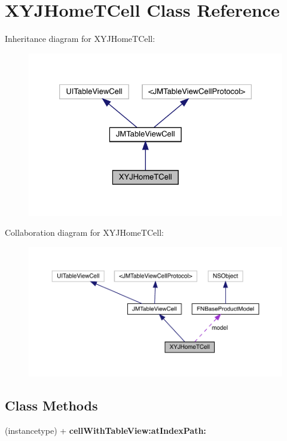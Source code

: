 \hypertarget{interface_x_y_j_home_t_cell}{}\section{X\+Y\+J\+Home\+T\+Cell Class Reference}
\label{interface_x_y_j_home_t_cell}


Inheritance diagram for X\+Y\+J\+Home\+T\+Cell\+:\nopagebreak
\begin{figure}[H]
\begin{center}
\leavevmode
\includegraphics[width=326pt]{interface_x_y_j_home_t_cell__inherit__graph}
\end{center}
\end{figure}


Collaboration diagram for X\+Y\+J\+Home\+T\+Cell\+:\nopagebreak
\begin{figure}[H]
\begin{center}
\leavevmode
\includegraphics[width=350pt]{interface_x_y_j_home_t_cell__coll__graph}
\end{center}
\end{figure}
\subsection*{Class Methods}
\begin{DoxyCompactItemize}
\item 
\mbox{\label{interface_x_y_j_home_t_cell_acde33f30f67df1e0e68a33f113e2fb03}} 
(instancetype) + {\bfseries cell\+With\+Table\+View\+:at\+Index\+Path\+:}
\end{DoxyCompactItemize}
